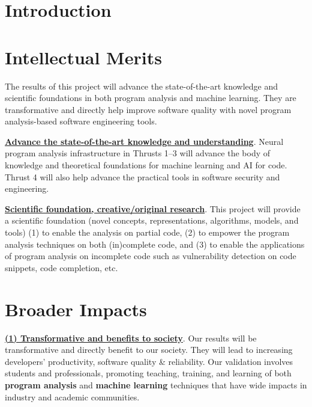 \section{Introduction}\label{sec:intro}



%





\section{Intellectual Merits}

The results of this project will advance the state-of-the-art
knowledge and scientific foundations in both program analysis and
machine learning. They are transformative and directly help improve
software quality with novel program analysis-based software
engineering tools.

\noindent \underline{{\bf Advance the state-of-the-art knowledge and
    understanding}}. Neural program analysis infrastructure in Thrusts
1--3 will advance the body of knowledge and theoretical foundations
for machine learning and AI for code. Thrust 4 will also help advance the
practical tools in software security and engineering.

\noindent \underline{{\bf Scientific foundation, creative/original
    research}}. This project will provide a scientific
foundation (novel concepts, representations, algorithms, models,
and tools) (1) to enable the analysis on partial code, (2) to empower
the program analysis techniques on both (in)complete code,
and (3) to enable the applications of program analysis on incomplete
code such as vulnerability detection on code snippets, code
completion, etc.

\section{Broader Impacts}

\underline{{\bf (1) Transformative and benefits to society}}. Our
results will be transformative and directly benefit to our society.
They will lead to increasing developers' productivity, software
quality \& reliability.  Our validation involves students and
professionals, promoting teaching, training, and learning of both {\bf
  program analysis} and {\bf machine learning} techniques that
have wide impacts in industry and academic communities.

